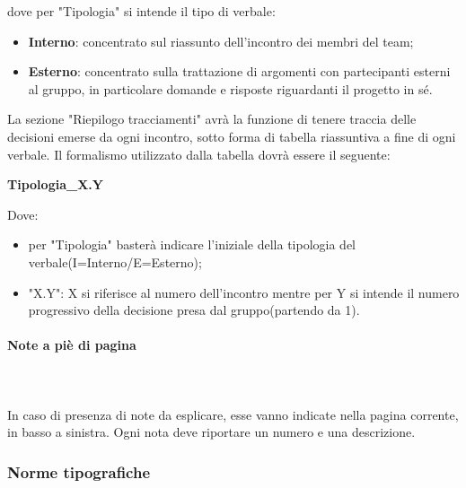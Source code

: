 		dove per "Tipologia" si intende il tipo di verbale:
		\begin{itemize}
			\item \textbf{Interno}: concentrato sul riassunto dell'incontro dei membri del team;
			\item \textbf{Esterno}: concentrato sulla trattazione di argomenti con partecipanti esterni al gruppo, in particolare domande e risposte riguardanti il progetto in sé.
		\end{itemize}
		La sezione "Riepilogo tracciamenti" avrà la funzione di tenere traccia delle decisioni emerse da ogni incontro, sotto forma di tabella riassuntiva a fine di ogni verbale. Il formalismo utilizzato dalla tabella dovrà essere il seguente: \newline \newline
		\centerline{\textbf{Tipologia\_X.Y}} \newline \newline
		Dove:
		\begin{itemize}
			\item per "Tipologia" basterà indicare l'iniziale della tipologia del verbale(I=Interno/E=Esterno);
			\item "X.Y": X si riferisce al numero dell'incontro mentre per Y si intende il numero progressivo della decisione presa dal gruppo(partendo da 1).
		\end{itemize}	
		\paragraph{Note a piè di pagina} \mbox{}\\ \mbox{}\\
		In caso di presenza di note da esplicare, esse vanno indicate nella pagina corrente, in basso a sinistra. Ogni nota deve riportare un numero e una descrizione.		
	\subsubsection{Norme tipografiche}
